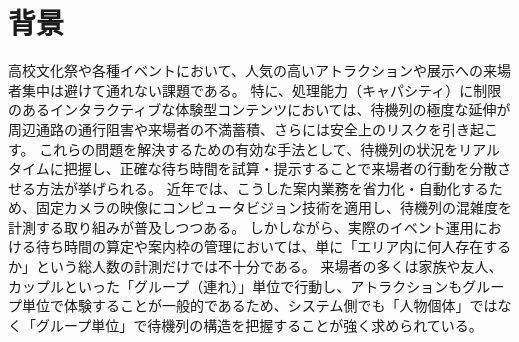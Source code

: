\section{背景}

高校文化祭や各種イベントにおいて、人気の高いアトラクションや展示への来場者集中は避けて通れない課題である。
特に、処理能力（キャパシティ）に制限のあるインタラクティブな体験型コンテンツにおいては、待機列の極度な延伸が周辺通路の通行阻害や来場者の不満蓄積、さらには安全上のリスクを引き起こす。
これらの問題を解決するための有効な手法として、待機列の状況をリアルタイムに把握し、正確な待ち時間を試算・提示することで来場者の行動を分散させる方法が挙げられる。
近年では、こうした案内業務を省力化・自動化するため、固定カメラの映像にコンピュータビジョン技術を適用し、待機列の混雑度を計測する取り組みが普及しつつある。
しかしながら、実際のイベント運用における待ち時間の算定や案内枠の管理においては、単に「エリア内に何人存在するか」という総人数の計測だけでは不十分である。
来場者の多くは家族や友人、カップルといった「グループ（連れ）」単位で行動し、アトラクションもグループ単位で体験することが一般的であるため、システム側でも「人物個体」ではなく「グループ単位」で待機列の構造を把握することが強く求められている。